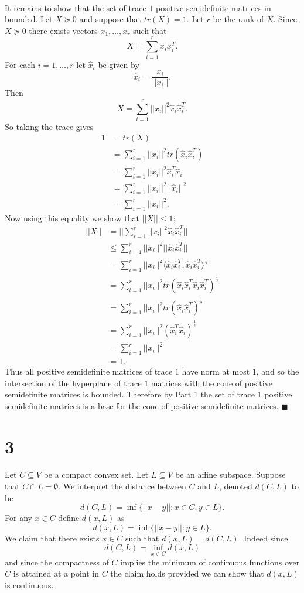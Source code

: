 \documentclass[letterpaper,12pt,oneside,onecolumn]{article}
\begin{document}
\paragraph{}
It remains to show that the set of trace $1$ positive semidefinite matrices in bounded. Let $X\succcurlyeq 0$ and suppose that $tr(X) = 1$. Let $r$ be the rank of $X$. Since $X \succcurlyeq 0$ there exists vectors $x_1, \dots, x_r$ such that
$$ X = \sum_{i=1}^r x_ix_i^T.$$
For each $i = 1,\dots,r$ let $\hat{x}_i$ be given by
$$ \hat{x}_i = \frac{x_i}{||x_i||}.$$
Then $$X = \sum_{i=1}^r ||x_i||^2 \hat{x}_i\hat{x}_i^T.$$
So taking the trace gives
\begin{align*}
1 &= tr(X) \\
&= \sum_{i=1}^r ||x_i||^2 tr(\hat{x}_i \hat{x}_i^T) \\
&= \sum_{i=1}^r ||x_i||^2 \hat{x}_i^T \hat{x}_i \\
&= \sum_{i=1}^r ||x_i||^2 ||\hat{x}_i||^2 \\
&= \sum_{i=1}^r ||x_i||^2.
\end{align*}
Now using this equality we show that $||X|| \leq 1$:
\begin{align*}
||X|| &= ||\sum_{i=1}^r ||x_i||^2 \hat{x}_i\hat{x}_i^T|| \\
&\leq \sum_{i=1}^r ||x_i||^2 ||\hat{x}_i\hat{x}_i^T|| \\
&= \sum_{i=1}^r ||x_i||^2 \langle \hat{x}_i \hat{x}_i^T, \hat{x}_i \hat{x}_i^T\rangle^{\frac{1}{2}} \\
&= \sum_{i=1}^r ||x_i||^2 tr(\hat{x}_i \hat{x}_i^T\hat{x}_i \hat{x}_i^T)^{\frac{1}{2}} \\
&= \sum_{i=1}^r ||x_i||^2 tr(\hat{x}_i \hat{x}_i^T)^\frac{1}{2} \\
&= \sum_{i=1}^r ||x_i||^2 (\hat{x}_i^T\hat{x}_i) ^\frac{1}{2} \\
&= \sum_{i=1}^r ||x_i||^2 \\
&= 1.
\end{align*}
Thus all positive semidefinite matrices of trace $1$ have norm at most $1$, and so the intersection of the hyperplane of trace $1$ matrices with the cone of positive semidefinite matrices is bounded. Therefore by Part 1 the set of trace $1$ positive semidefinite matrices is a base for the cone of positive semidefinite matrices. $\blacksquare$
\section*{3}
\paragraph{}
Let $C\subseteq V$ be a compact convex set. Let $L\subseteq V$ be an affine subspace. Suppose that $C \cap L = \emptyset$. We interpret the distance between $C$ and $L$, denoted $d(C,L)$ to be
$$d(C,L) = \inf \{||x - y|| : x \in C, y\in L\}.$$
For any $x \in C$ define $d(x,L)$ as
$$d(x,L) = \inf \{||x-y|| : y \in L\}.$$
We claim that there exists $x \in C$ such that $d(x,L) = d(C,L)$. Indeed since
$$d(C,L) = \inf_{x \in C} d(x,L)$$
and since the compactness of $C$ implies the minimum of continuous functions over $C$ is attained at a point in $C$ the claim holds provided we can show that $d(x,L)$ is continuous.
\end{document}
